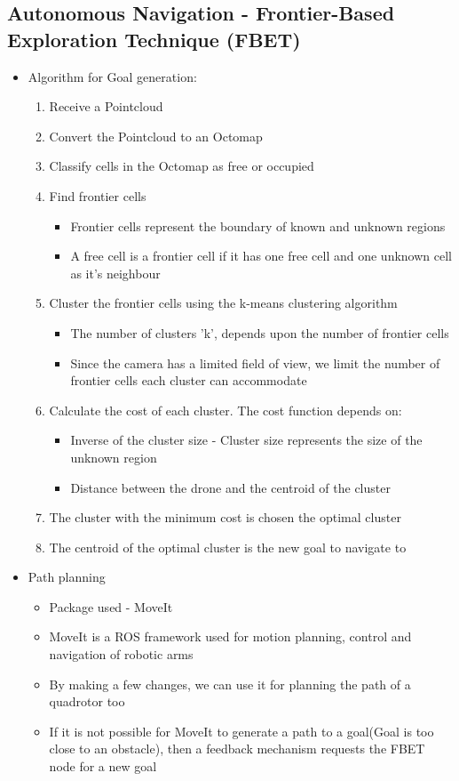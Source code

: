 \documentclass[a4paper,12pt,oneside]{book}
\begin{document}
\subsection*{Autonomous Navigation - Frontier-Based Exploration Technique (FBET)}
\begin{itemize}
	\item Algorithm for Goal generation:
	\begin{enumerate}
		\item Receive a Pointcloud
		\item Convert the Pointcloud to an Octomap
		\item Classify cells in the Octomap as free or occupied
		\item Find frontier cells
		\begin{itemize}
			\item Frontier cells represent the boundary of known and unknown regions
			\item A free cell is a frontier cell if it has one free cell and one unknown cell as it's neighbour
		\end{itemize}
		\item Cluster the frontier cells using the k-means clustering algorithm
			\begin{itemize}
				\item The number of clusters 'k', depends upon the number of frontier cells
				\item Since the camera has a limited field of view, we limit the number of frontier cells each cluster can accommodate
			\end{itemize}
		\item Calculate the cost of each cluster. The cost function depends on:
		\begin{itemize}
			\item Inverse of the cluster size - Cluster size represents the size of the unknown region
			\item Distance between the drone and the centroid of the cluster
		\end{itemize}
		\item The cluster with the minimum cost is chosen the optimal cluster
		\item The centroid of the optimal cluster is the new goal to navigate to
	\end{enumerate}
	
	\item Path planning
		\begin{itemize}
			\item Package used - MoveIt
			\item MoveIt is a ROS framework used for motion planning, control and navigation of robotic arms
			\item By making a few changes, we can use it for planning the path of a quadrotor too
			\item If it is not possible for MoveIt to generate a path to a goal(Goal is too close to an obstacle), then a feedback mechanism requests the FBET node for a new goal
		\end{itemize}


\end{itemize}
\end{document}
